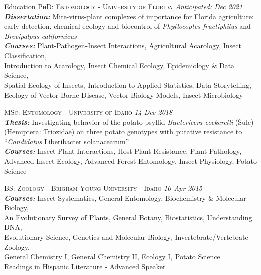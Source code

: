 \documentclass{resume} %
\begin{document}
\begin{rSection}{Education}
	\textsc{PhD: Entomology - University of Florida} \hfill {\em Anticipated: Dec 2021}\\
	\textit{\textbf{Dissertation:}} Mite-virus-plant complexes of importance for Florida agriculture: early detection, chemical ecology and biocontrol of \textit{Phyllocoptes fructiphilus} and \textit{Brevipalpus californicus} \\
	\textit{\textbf{Courses:}} Plant-Pathogen-Insect Interactions, Agricultural Acarology, Insect Classification,\\
	Introduction to Acarology, Insect Chemical Ecology, Epidemiology \& Data Science,\\
	Spatial Ecology of Insects, Introduction to Applied Statistics, Data Storytelling,\\
	Ecology of Vector-Borne Disease, Vector Biology Models, Insect Microbiology\\ \hfill

	\textsc{MSc: Entomology - University of Idaho} \hfill {\em 14 Dec 2018}\\ \textit{\textbf{Thesis:}} Investigating behavior of the potato psyllid \textit{Bactericera cockerelli} (Šulc)\\
	(Hemiptera: Triozidae) on three potato genotypes with putative resistance to\\ “\textit{Candidatus} Liberibacter solanacearum”\\
	\textit{\textbf{Courses:}} Insect-Plant Interactions, Host Plant Resistance, Plant Pathology, Advanced Insect Ecology, Advanced Forest Entomology, Insect Physiology, Potato Science\\ \hfill
	
	\textsc{BS: Zoology - Brigham Young University - Idaho} \hfill {\em 10 Apr 2015}\\ \textit{\textbf{Courses:}} Insect Systematics, General Entomology, Biochemistry \& Molecular Biology,\\
	An Evolutionary Survey of Plants, General Botany, Biostatistics, Understanding DNA,\\
	Evolutionary Science, Genetics and Molecular Biology, Invertebrate/Vertebrate Zoology,\\
	General Chemistry I, General Chemistry II,  Ecology I, Potato Science\\
	Readings in Hispanic Literature - Advanced Speaker\\ \hfill
\end{rSection}
\end{document}
